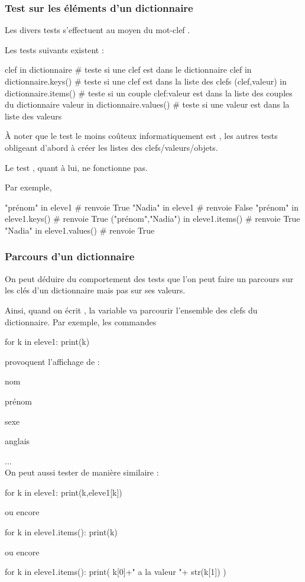 \documentclass[11pt,a4paper,french,twoside]{PMCours}
\begin{document}
\subsubsection*{Test sur les éléments d'un dictionnaire}

Les divers tests s'effectuent au moyen du mot-clef  .

Les tests suivants existent :  
\begin{Python}
clef in dictionnaire
# teste si une clef est dans le dictionnaire
clef in dictionnaire.keys()
# teste si une clef est dans la liste des clefs
(clef,valeur) in dictionnaire.items()
# teste si un couple clef:valeur est dans la liste des couples du dictionnaire
valeur in dictionnaire.values()
# teste si une valeur est dans la liste des valeurs
\end{Python}
\`A noter que le test le moins coûteux informatiquement est , 
les autres tests obligeant d'abord à créer les listes des clefs/valeurs/objets.

Le test , quant à lui, ne fonctionne pas. 

Par exemple,
\begin{Python}
"prénom" in eleve1                   # renvoie True
"Nadia" in eleve1                    # renvoie False
"prénom" in eleve1.keys()            # renvoie True
("prénom","Nadia") in eleve1.items() # renvoie True
"Nadia" in eleve1.values()           # renvoie True
\end{Python}
\subsubsection*{Parcours d'un dictionnaire}
On peut déduire du comportement des tests que l'on peut faire un parcours sur 
les clés d'un dictionnaire mais pas sur ses valeurs.

Ainsi, quand on écrit , la variable  va 
parcourir l'ensemble des clefs du dictionnaire. 
Par exemple, les commandes 
\begin{Python}
for k in eleve1:
	print(k)
\end{Python}
provoquent l'affichage de :

nom

prénom

sexe

anglais

... 
\medskip\\
On peut aussi tester de manière similaire : 
\begin{Python}
for k in eleve1:
	print(k,eleve1[k])
\end{Python}
ou encore 
\begin{Python}
for k in eleve1.items():
	print(k)
\end{Python}
ou encore 
\begin{Python}
for k in eleve1.items():
	print( k[0]+" a la valeur "+ str(k[1]) )
\end{Python}
\end{document}
